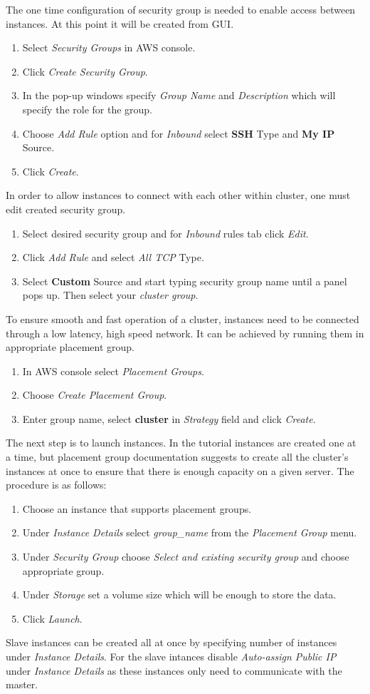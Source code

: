 \documentclass[12pt,english]{article}
\begin{document}
The one time configuration of security group is needed to enable access between instances. At this point it will be created from GUI.
\begin{enumerate}
	\item Select \textit{Security Groups} in AWS console.
	\item Click \textit{Create Security Group}.
	\item In the pop-up windows specify \textit{Group Name} and \textit{Description} which will specify the role for the group.
	\item Choose \textit{Add Rule} option and for \textit{Inbound} select \textbf{SSH} Type and \textbf{My IP} Source.
	\item Click \textit{Create}.
\end{enumerate}
In order to allow instances to connect with each other within cluster, one must edit created security group.
\begin{enumerate}
	\item Select desired security group and for \textit{Inbound} rules tab click \textit{Edit}.
	\item Click \textit{Add Rule} and select \textit{All TCP} Type.
	\item Select \textbf{Custom} Source and start typing security group name until a panel pops up. Then select your \textit{cluster group}.
\end{enumerate}
To ensure smooth and fast operation of a cluster, instances need to be connected through a low latency, high speed network. It can be achieved by running them in appropriate placement group.
\begin{enumerate}
	\item In AWS console select \textit{Placement Groups}.
	\item Choose \textit{Create Placement Group}.
	\item Enter group name, select \textbf{cluster} in \textit{Strategy} field and click \textit{Create}.
\end{enumerate}
The next step is to launch instances. In the tutorial instances are created one at a time, but placement group documentation suggests to create all the cluster's instances at once to ensure that there is enough capacity on a given server. The procedure is as follows:
\begin{enumerate}
	\item Choose an instance that supports placement groups.
	\item Under \textit{Instance Details} select \textit{group\_name} from the \textit{Placement Group} menu.
	\item Under \textit{Security Group} choose \textit{Select and existing security group} and choose appropriate group.
	\item Under \textit{Storage} set a volume size which will be enough to store the data.
	\item Click \textit{Launch}.
\end{enumerate}
Slave instances can be created all at once by specifying number of instances under \textit{Instance Details}. For the slave intances disable \textit{Auto-assign Public IP} under \textit{Instance Details} as these instances only need to communicate with the master.
\end{document}
